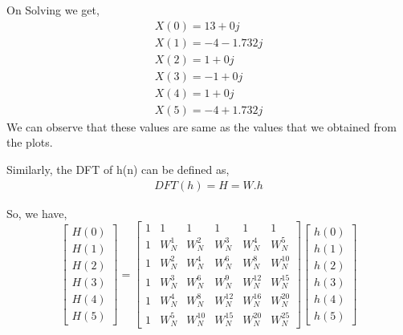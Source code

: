 \documentclass[journal,12pt,twocolumn]{IEEEtran}
\renewcommand\thesection{\arabic{section}}
\begin{document}
\begin{enumerate}[label=\thesection.\arabic*.,ref=\thesection.\theenumi]
On Solving we get,
\begin{align}
    X(0)= 13 + 0j \\
    X(1)= -4 - 1.732j \\
    X(2)= 1 + 0j \\
    X(3)= -1 + 0j \\
    X(4)= 1 + 0j \\
    X(5)= -4 + 1.732j
\end{align}
We can observe that these values are same as the values that we obtained from the plots.
\bigskip


Similarly, the DFT of h(n) can be defined as,
\begin{align}
    DFT(h)= H = W.h  \label{eq:dfth}
\end{align}

So, we have,
\begin{equation}
 \begin{bmatrix} H(0) \\ H(1) \\ H(2) \\ H(3) \\ H(4) \\ H(5) \end{bmatrix}
=
\begin{bmatrix}
1 & 1 & 1 & 1 & 1 & 1 \\ 1 & W_N^1& W_N^2& W_N^3 & W_N^4 & W_N^5\\1 & W_N^2 & W_N^4 & W_N^6 & W_N^8 & W_N^{10}\\1 & W_N^3 & W_N^6 & W_N^9 & W_N^{12} & W_N^{15}\\1 & W_N^4 & W_N^8 & W_N^{12} & W_N^{16} & W_N^{20}\\1 & W_N^5 & W_N^{10} & W_N^{15} & W_N^{20} &W_N^{25}
\end{bmatrix}
\begin{bmatrix}
h(0) \\ h(1) \\ h(2) \\ h(3) \\ h(4) \\ h(5)
\end{bmatrix}
\end{equation}


\end{enumerate}
\end{document}
